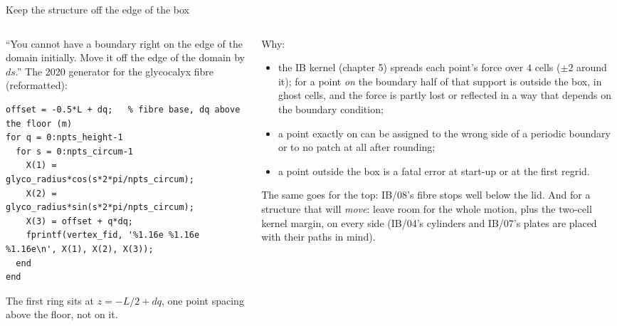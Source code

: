 \documentclass[aspectratio=169,11pt]{beamer}
\begin{document}
\begin{frame}[fragile]{Keep the structure off the edge of the box}
\label{fr:edge}
\begin{columns}[T,onlytextwidth]
\begin{column}{0.5\textwidth}
\footnotesize ``You cannot have a boundary right on the edge of the domain initially. Move it off the edge of the domain by $ds$.'' The 2020 generator for the glycocalyx fibre (reformatted):
\begin{lstlisting}[style=matlabtiny]
offset = -0.5*L + dq;   % fibre base, dq above the floor (m)
for q = 0:npts_height-1
  for s = 0:npts_circum-1
    X(1) = glyco_radius*cos(s*2*pi/npts_circum);
    X(2) = glyco_radius*sin(s*2*pi/npts_circum);
    X(3) = offset + q*dq;
    fprintf(vertex_fid, '%1.16e %1.16e %1.16e\n', X(1), X(2), X(3));
  end
end
\end{lstlisting}
\footnotesize The first ring sits at $z = -L/2 + dq$, one point spacing above the floor, not on it.
\end{column}
\begin{column}{0.48\textwidth}
\footnotesize Why:
\begin{itemize}
  \item the IB kernel (chapter 5) spreads each point's force over $4$ cells ($\pm2$ around it); for a point \emph{on} the boundary half of that support is outside the box, in ghost cells, and the force is partly lost or reflected in a way that depends on the boundary condition;
  \item a point exactly on  can be assigned to the wrong side of a periodic boundary or to no patch at all after rounding;
  \item a point outside the box is a fatal error at start-up or at the first regrid.
\end{itemize}
\footnotesize The same goes for the top: IB/08's fibre stops well below the lid. And for a structure that will \emph{move}: leave room for the whole motion, plus the two-cell kernel margin, on every side (IB/04's cylinders and IB/07's plates are placed with their paths in mind).
\end{column}
\end{columns}
\end{frame}
\end{document}
